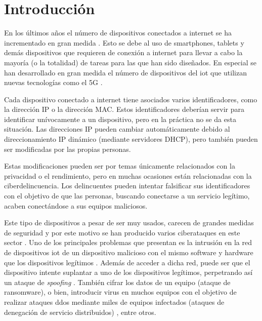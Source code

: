 
\chapter{Introducción} \label{chap:intro}

En los últimos años el número de dispositivos conectados a internet se ha incrementado en gran medida \cite{84Billio53:online}. Esto se debe al uso de smartphones, tablets y demás dispositivos que requieren de conexión a internet para llevar a cabo la mayoría (o la totalidad) de tareas para las que han sido diseñados. En especial se han desarrollado en gran medida el número de dispositivos del \acrfull{iot} que utilizan nuevas tecnologías como el 5G \cite{shafique2020internet}.

Cada dispositivo conectado a internet tiene asociados varios identificadores, como la dirección IP o la dirección MAC. Estos identificadores deberían servir para identificar unívocamente a un dispositivo, pero en la práctica no se da esta situación. Las direcciones IP pueden cambiar automáticamente debido al direccionamiento IP dinámico (mediante servidores DHCP), pero también pueden ser modificadas por las propias personas. 

Estas modificaciones pueden ser por temas únicamente relacionados con la privacidad o el rendimiento, pero en muchas ocasiones están relacionadas con la ciberdelincuencia. Los delincuentes pueden intentar falsificar sus identificadores con el objetivo de que las personas, buscando conectarse a un servicio legítimo, acaben conectándose a sus equipos maliciosos.

Este tipo de dispositivos a pesar de ser muy usados, carecen de grandes medidas de seguridad y por este motivo se han producido varios ciberataques en este sector \cite{miller2012survey} \cite{nicholson2012scada}. Uno de los principales problemas que presentan es la intrusión en la red de dispositivos \acrshort{iot} de un dispositivo malicioso con el mismo software y hardware que los dispositivos legítimos \cite{bisio2018unauthorized}. Además de acceder a dicha red, puede ser que el dispositivo intente suplantar a uno de los dispositivos legítimos, perpetrando así un ataque de \textit{spoofing} \cite{nosouhi2022towards} \cite{wang2018efficient}. También cifrar los datos de un equipo (ataque de ransomware), o bien, introducir virus en muchos equipos con el objetivo de realizar ataques \acrfull{ddos} mediante miles de equipos infectados (ataques de denegación de servicio distribuidos) \cite{hoque2015botnet}, entre otros.

